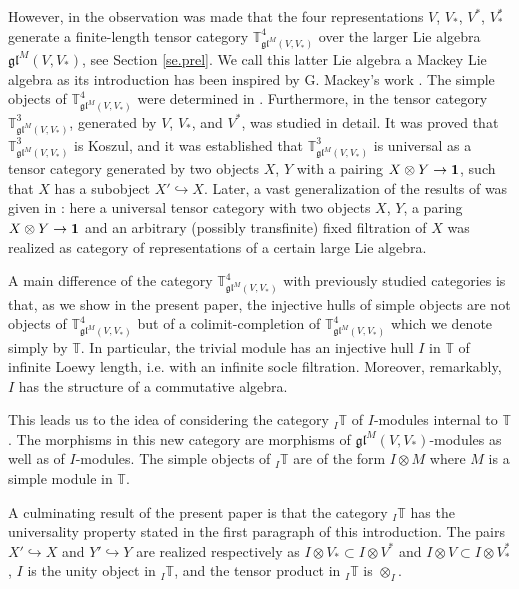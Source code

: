 \documentclass[11pt]{article}
\theoremstyle{plain}
\theoremstyle{nonumberplain}
\theoremstyle{plain}
\numberwithin{equation}{section}
\theoremstyle{nonumberplain}
\newcommand\bT{{\mathbb T}}
\newcommand\fgl{\mathfrak{gl}}
\newcommand\1{{\bf 1}}
\begin{document}
However, in \cite{PS2} the observation was made that the four representations $V$, $V_*$, $V^*$, $V_*^*$ generate a finite-length tensor category $\bT^{4}_{\mathfrak{gl}^M(V,V_*)}$ over the larger Lie algebra $\mathfrak{gl}^M(V,V_*)$, see Section \ref{se.prel}. We call this latter Lie algebra a Mackey Lie algebra as its introduction has been inspired by G. Mackey's work \cite{M}. The simple objects of $\bT^{4}_{\mathfrak{gl}^M(V,V_*)}$ were determined in \cite{Chi14}. Furthermore, in \cite{us0} the tensor category $\bT^{3}_{\mathfrak{gl}^M(V,V_*)}$, generated by $V$, $V_*$, and  $V^*$, was studied in detail. It was proved that $\bT^{3}_{\mathfrak{gl}^M(V,V_*)}$ is Koszul, and it was established that $\bT^{3}_{\mathfrak{gl}^M(V,V_*)}$ is universal as a tensor category generated by two objects $X$, $Y$ with a pairing $X\otimes Y\rightarrow {\bf 1}$, such that $X$ has a subobject $X'\hookrightarrow X$. Later, a vast generalization of the results of \cite{us0} was given in \cite{us1}: here a universal tensor category with two objects $X$, $Y$, a paring $X\otimes Y\rightarrow {\bf 1}$ and an arbitrary (possibly transfinite) fixed filtration of $X$ was realized as category of representations of a certain large Lie algebra.

A main difference of the category  $\bT^{4}_{\mathfrak{gl}^M(V,V_*)}$ with previously studied categories is that, as we show in the present paper, the injective hulls of simple objects are not objects of  $\bT^{4}_{\mathfrak{gl}^M(V,V_*)}$ but of a colimit-completion of $\bT^{4}_{\mathfrak{gl}^M(V,V_*)}$ which we denote simply by $\bT$. In particular, the trivial module has an injective hull $I$ in $\bT$ of infinite Loewy length, i.e. with an infinite socle filtration. Moreover, remarkably, $I$ has the structure of a commutative algebra. 

This leads us to the idea of considering the category ${}_I\bT$ of $I$-modules internal to $\bT$. The morphisms in this new category are morphisms of $\fgl^M(V,V_*)$-modules as well as of $I$-modules. The simple objects of ${}_I\bT$ are of the form $I\otimes M$ where $M$ is a simple module in $\bT$. 

A culminating result of the present paper is that the category ${}_I\bT$ has the universality property stated in the first paragraph of this introduction. The pairs $X'\hookrightarrow X$ and $Y'\hookrightarrow Y$ are realized respectively as $I \otimes V_*\subset I \otimes V^* $ and $I \otimes V\subset I \otimes V_*^*$, $I$ is the unity object in ${}_I\bT$, and the tensor product in ${}_I\bT$ is $\otimes_I$.
\end{document}
